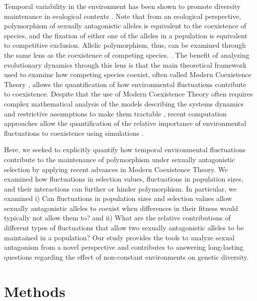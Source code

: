 \documentclass[12pt]{article}
\begin{document}
Temporal variability in the environment has been shown to promote diversity maintenance in ecological contexts \citep{levins1979coexistence,armstrong1980competitive,chesson2000general,barabas_chessons_2018}. Note that from an ecological perspective, polymorphism of sexually antagonistic alleles is equivalent to the coexistence of species, and the fixation of either one of the alleles in a population is equivalent to competitive exclusion. Allelic polymorphism, thus, can be examined through the same lens as the coexistence of competing species. \citep{ellner1994role,ellner1996patterns,dean2005protecting,schreiber2010interactive}. The benefit of analyzing evolutionary dynamics through this lens is that the main theoretical framework used to examine how competing species coexist, often called Modern Coexistence Theory \citep{Chesson2000, barabas_chessons_2018}, allows the quantification of how environmental fluctuations contribute to coexistence. Despite that the use of Modern Coexistence Theory often requires complex mathematical analysis of the models describing the systems dynamics and restrictive assumptions to make them tractable \citep{barabas_chessons_2018}, recent computation approaches allow the quantification of the relative importance of environmental fluctuations to coexistence using simulations \citep{ellner2016quantify,ellner_expanded_2019,shoemaker2020}.

Here, we seeked to explicitly quantify how temporal environmental fluctuations contribute to the maintenance of polymorphism under sexually antagonistic selection by applying recent advances in Modern Coexistence Theory.  We examined how fluctuations in selection values, fluctuations in population sizes, and their interactions can further or hinder polymorphism. In particular, we examined i) Can fluctuations in population sizes and selection values allow sexually antagonistic alleles to coexist when differences in their fitness would typically not allow them to? and ii) What are the relative contributions of different types of fluctuations that allow two sexually antagonistic alleles to be maintained in a population? Our study provides the tools to analyze sexual antagonism from a novel perspective and contributes to answering long-lasting questions regarding the effect of non-constant environments on genetic diversity.


\section{Methods}
\end{document}
